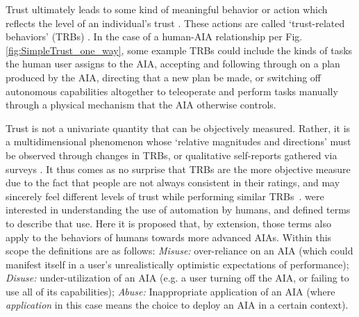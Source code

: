
Trust ultimately leads to some kind of meaningful behavior or action which reflects the level of an individual's trust \cite{Lewis1985-pr}. 
These actions are called `trust-related behaviors' (TRBs) \cite{McKnight2001-fa}. %
In the case of a human-AIA relationship per Fig. \ref{fig:SimpleTrust_one_way}, %
some example TRBs could include the kinds of tasks the human user assigns to the AIA, accepting and following through on a plan produced by the AIA, directing that a new plan be made, or switching off autonomous capabilities altogether to teleoperate and perform tasks manually through a physical mechanism that the AIA otherwise controls.  %

    
    Trust is not a univariate quantity that can be objectively measured. Rather, it is a multidimensional phenomenon whose `relative magnitudes and directions' must be observed through changes in TRBs, or qualitative self-reports gathered via surveys \cite{Muir1996-gt}. It thus comes as no surprise that TRBs are the more objective measure due to the fact that people are not always consistent in their ratings, and may sincerely feel different levels of trust while performing similar TRBs~\cite{Dzindolet2003-ts}. \citet{Parasuraman1997-co} were interested in understanding the use of automation by humans, and defined terms to describe that use. Here it is proposed that, by extension, those terms also apply to the behaviors of humans towards more advanced AIAs. Within this scope the definitions are as follows: \textit{Misuse:} over-reliance on an AIA (which could manifest itself in a user's unrealistically optimistic expectations of performance); \textit{Disuse:} under-utilization of an AIA (e.g. a user turning off the AIA, or failing to use all of its capabilities); \textit{Abuse:} Inappropriate application of an AIA (where \emph{application} in this case means the choice to deploy an AIA in a certain context).

